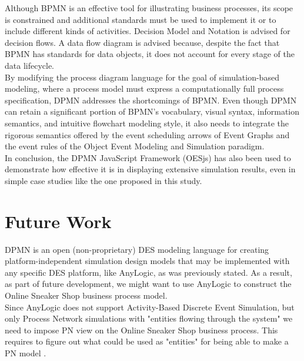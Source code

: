 \documentclass{article}
\begin{document}
Although BPMN is an effective tool for illustrating business processes, its scope is constrained and additional standards must be used to implement it or to include different kinds of activities. Decision Model and Notation is advised for decision flows. A data flow diagram is advised because, despite the fact that BPMN has standards for data objects, it does not account for every stage of the data lifecycle.\\
By modifying the process diagram language for the goal of simulation-based modeling, where a process model must express a computationally full process specification, DPMN addresses the shortcomings of BPMN. Even though DPMN can retain a significant portion of BPMN's vocabulary, visual syntax, information semantics, and intuitive flowchart modeling style, it also needs to integrate the rigorous semantics offered by the event scheduling arrows of Event Graphs and the event rules of the Object Event Modeling and Simulation paradigm.\\
In conclusion, the DPMN JavaScript Framework (OESjs) has also been used to demonstrate how effective it is in displaying extensive simulation results, even in simple case studies like the one proposed in this study.

\section{Future Work}
DPMN is an open (non-proprietary) DES modeling language for creating platform-independent simulation design models that may be implemented with any specific DES platform, like AnyLogic, as was previously stated. As a result, as part of future development, we might want to use AnyLogic to construct the Online Sneaker Shop business process model.\\
Since AnyLogic does not support Activity-Based Discrete Event Simulation, but only Process Network simulations with "entities flowing through the system" we need to impose PN view on the Online Sneaker Shop business process. This requires to figure out what could be used as "entities" for being able to make a PN model \cite{Wagner}.
\end{document}
